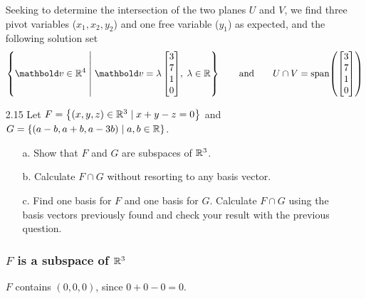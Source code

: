 \documentclass[11pt]{article}
\begin{document}
\begin{enumerate}
          Seeking to determine the intersection of the two planes $U$ and $V$, we find three pivot variables ($x_1,
              x_2, y_2$) and one free variable ($y_1$) as expected, and the following solution set
          \[
              \set{
                  \vect{v} \in \R^4
                  \; \middle | \;
                  \vect{v} = \lambda
                  \begin{bmatrix}
                      3 \\ 7 \\ 1 \\ 0
                  \end{bmatrix}
                  \! , \;
                  \lambda \in \R
              }
              \qquad
              \text{and}
              \qquad
              U \cap V =
              \Span \args{
                  \begin{bmatrix}
                      3 \\ 7 \\ 1 \\ 0
                  \end{bmatrix}
              }
          \]

          \pagebreak

    \item[2.15] Let $F = \left\{ (x, y, z) \in \mathbb{R}^3 \mid x + y - z = 0 \right\}$ and
          $G = \left\{ (a - b, a + b, a - 3b) \mid a, b \in \mathbb{R} \right\}$.

          \begin{enumerate}
              \item[a.] Show that $F$ and $G$ are subspaces of $\mathbb{R}^3$.

              \item[b.] Calculate $F \cap G$ without resorting to any basis vector.

              \item[c.] Find one basis for $F$ and one basis for $G$.  Calculate $F \cap G$ using the basis vectors
                    previously found and check your result with the previous question.
          \end{enumerate}

          \subsubsection*{$F$ is a subspace of $\mathbb{R}^3$}


          $F$ contains $(0, 0, 0)$, since $0 + 0 - 0 = 0$.


\end{enumerate}
\end{document}

